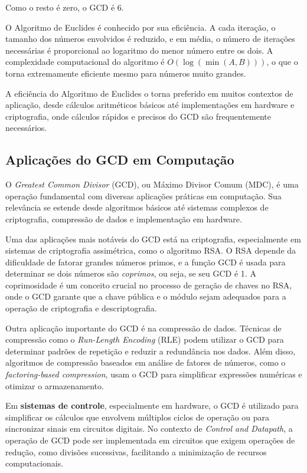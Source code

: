 \documentclass[a4paper,11pt]{article} %
\begin{document}
Como o resto é zero, o GCD é 6.

O Algoritmo de Euclides é conhecido por sua eficiência. A cada iteração, o tamanho dos números envolvidos é reduzido, e em média, o número de iterações necessárias é proporcional ao logaritmo do menor número entre os dois. A complexidade computacional do algoritmo é \( O(\log(\min(A, B))) \), o que o torna extremamente eficiente mesmo para números muito grandes.

A eficiência do Algoritmo de Euclides o torna preferido em muitos contextos de aplicação, desde cálculos aritméticos básicos até implementações em hardware e criptografia, onde cálculos rápidos e precisos do GCD são frequentemente necessários.

\subsection{Aplicações do GCD em Computação}
O \textit{Greatest Common Divisor} (GCD), ou Máximo Divisor Comum (MDC), é uma operação fundamental com diversas aplicações práticas em computação. Sua relevância se estende desde algoritmos básicos até sistemas complexos de criptografia, compressão de dados e implementação em hardware.

Uma das aplicações mais notáveis do GCD está na criptografia, especialmente em sistemas de criptografia assimétrica, como o algoritmo RSA. O RSA depende da dificuldade de fatorar grandes números primos, e a função GCD é usada para determinar se dois números são \textit{coprimos}, ou seja, se seu GCD é 1. A coprimosidade é um conceito crucial no processo de geração de chaves no RSA, onde o GCD garante que a chave pública e o módulo sejam adequados para a operação de criptografia e descriptografia.

Outra aplicação importante do GCD é na compressão de dados. Técnicas de compressão como o \textit{Run-Length Encoding} (RLE) podem utilizar o GCD para determinar padrões de repetição e reduzir a redundância nos dados. Além disso, algoritmos de compressão baseados em análise de fatores de números, como o \textit{factoring-based compression}, usam o GCD para simplificar expressões numéricas e otimizar o armazenamento.

Em \textbf{sistemas de controle}, especialmente em hardware, o GCD é utilizado para simplificar os cálculos que envolvem múltiplos ciclos de operação ou para sincronizar sinais em circuitos digitais. No contexto de \textit{Control and Datapath}, a operação de GCD pode ser implementada em circuitos que exigem operações de redução, como divisões sucessivas, facilitando a minimização de recursos computacionais.
\end{document}
